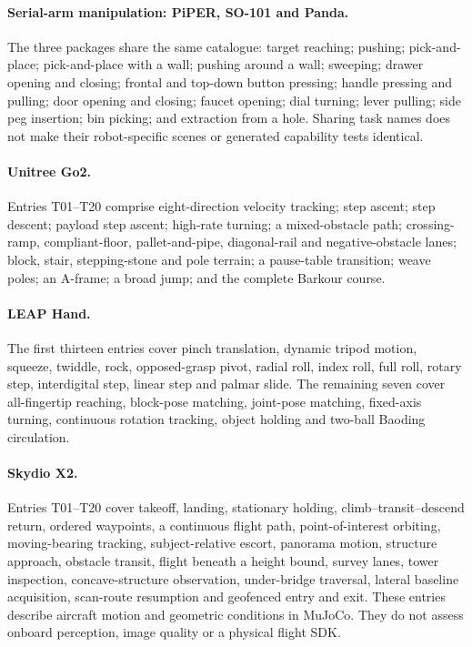 \begingroup
\small
{}
\paragraph{Serial-arm manipulation: PiPER, SO-101 and Panda.}
The three packages share the same catalogue: target reaching; pushing;
pick-and-place; pick-and-place with a wall; pushing around a wall;
sweeping; drawer opening and closing; frontal and top-down button pressing;
handle pressing and pulling; door opening and closing; faucet opening;
dial turning; lever pulling; side peg insertion; bin picking; and extraction
from a hole. Sharing task names does not make their robot-specific scenes
or generated capability tests identical.

\paragraph{Unitree Go2.}
Entries T01--T20 comprise eight-direction velocity tracking; step ascent;
step descent; payload step ascent; high-rate turning; a mixed-obstacle path;
crossing-ramp, compliant-floor, pallet-and-pipe, diagonal-rail and
negative-obstacle lanes; block, stair, stepping-stone and pole terrain;
a pause-table transition; weave poles; an A-frame; a broad jump; and the
complete Barkour course.

\paragraph{LEAP Hand.}
The first thirteen entries cover pinch translation, dynamic tripod motion,
squeeze, twiddle, rock, opposed-grasp pivot, radial roll, index roll,
full roll, rotary step, interdigital step, linear step and palmar slide.
The remaining seven cover all-fingertip reaching, block-pose matching,
joint-pose matching, fixed-axis turning, continuous rotation tracking,
object holding and two-ball Baoding circulation.

\paragraph{Skydio X2.}
Entries T01--T20 cover takeoff, landing, stationary holding,
climb--transit--descend return, ordered waypoints, a continuous flight path,
point-of-interest orbiting, moving-bearing tracking, subject-relative escort,
panorama motion, structure approach, obstacle transit, flight beneath a height
bound, survey lanes, tower inspection, concave-structure observation,
under-bridge traversal, lateral baseline acquisition, scan-route resumption
and geofenced entry and exit.
These entries describe aircraft motion and geometric conditions in MuJoCo.
They do not assess onboard perception, image quality or a physical flight SDK.
\endgroup


